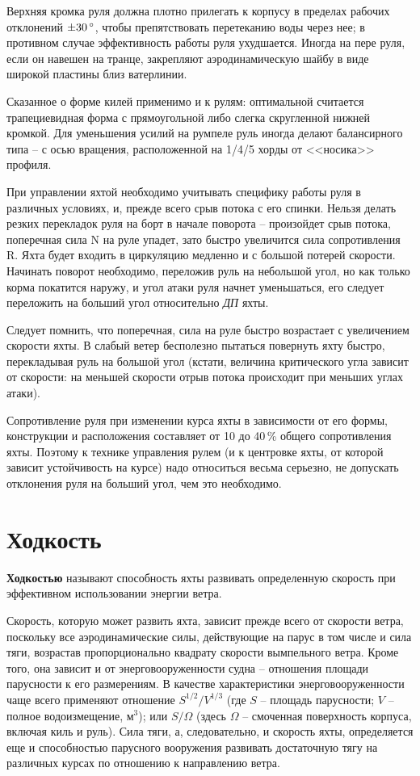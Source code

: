 Верхняя кромка руля должна плотно прилегать к корпусу в пределах рабочих отклонений $\pm 30\,^\circ$, чтобы препятствовать перетеканию воды через нее; в противном случае эффективность работы руля ухудшается. Иногда на пере руля, если он навешен на транце, закрепляют аэродинамическую шайбу в виде широкой пластины близ ватерлинии.

Сказанное о форме килей применимо и к рулям: оптимальной считается трапециевидная форма с прямоугольной либо слегка скругленной нижней кромкой. Для уменьшения усилий на румпеле руль иногда делают балансирного типа \--- с осью вращения, расположенной на 1/4/5 хорды от <<носика>> профиля.

При управлении яхтой необходимо учитывать специфику работы руля в различных условиях, и, прежде всего срыв потока с его спинки. Нельзя делать резких перекладок руля на борт в начале поворота \--- произойдет срыв потока, поперечная сила \ve N на руле упадет, зато быстро увеличится сила сопротивления \ve R. Яхта будет входить в циркуляцию медленно и с большой потерей скорости. Начинать поворот необходимо, переложив руль на небольшой угол, но как только корма покатится наружу, и угол атаки руля начнет уменьшаться, его следует переложить на больший угол относительно \textit{ДП} яхты. 

Следует помнить, что поперечная, сила на руле быстро возрастает с увеличением скорости яхты. В слабый ветер бесполезно пытаться повернуть яхту быстро, перекладывая руль на большой угол (кстати, величина критического угла зависит от скорости: на меньшей скорости отрыв потока происходит при меньших углах атаки).

Сопротивление руля при изменении курса яхты в зависимости от его формы, конструкции и расположения составляет от 10 до 40\,\% общего сопротивления яхты. Поэтому к технике управления рулем (и к центровке яхты, от которой зависит устойчивость на курсе) надо относиться весьма серьезно, не допускать отклонения руля на больший угол, чем это необходимо.

\section{Ходкость}

\textbf{Ходкостью} называют способность яхты развивать определенную скорость при эффективном использовании энергии ветра.

Скорость, которую может развить яхта, зависит прежде всего от скорости ветра, поскольку все аэродинамические силы, действующие на парус в том числе и сила тяги, возрастав пропорционально квадрату скорости вымпельного ветра. Кроме того, она зависит и от энерговооруженности судна \--- отношения площади парусности к его размерениям. В качестве характеристики энерговооруженности чаще всего применяют отношение $S^{1/2} / V^{1/3}$
(где $S$ \--- площадь парусности\msq; $V$ \--- полное водоизмещение, м$^3$); или $S / \Omega$ 
(здесь $\Omega$ \--- смоченная поверхность корпуса, включая киль и руль). Сила тяги, а, следовательно, и скорость яхты, определяется еще и способностью парусного вооружения развивать достаточную тягу на различных курсах по отношению к направлению ветра.

